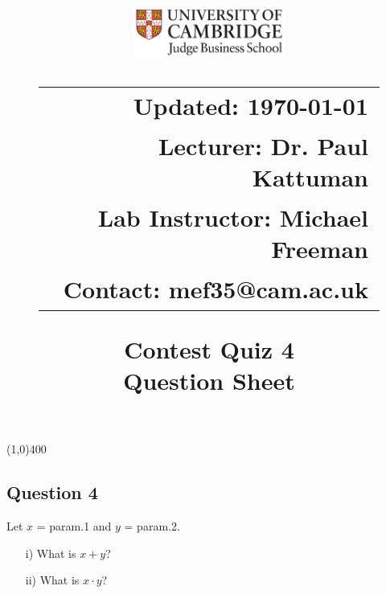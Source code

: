 \documentclass[11pt,a4paper]{article}
\title{\begin{figure}[t!]\vspace{-30px}\hspace{-30px}\includegraphics[width=50mm]{jbslogo.jpg}
\hspace{160px}\parbox{8cm}{\vspace{-30px}\begin{tabular}{ r} {\bf Updated:}\hspace{16px} \today \vspace*{0.2cm}\\ {\bf Lecturer:}\hspace{3px} Dr. Paul Kattuman \\{\bf Lab Instructor:}\hspace{16px} Michael Freeman \\ {\bf Contact:}\hspace{13px} mef35@cam.ac.uk\end{tabular}}
\end{figure}
\vspace{-1cm}\Huge Contest Quiz 4\\\vspace*{0.2cm} \huge Question Sheet \author{}\date{}}
\begin{document}
\maketitle
\begin{center}\vspace{-1.4cm}
\line(1,0){400}
\end{center}

\subsection*{Question 4}
Let $x$ = param.1 and $y$ = param.2.
\begin{itemize}
 \item[i)] What is $x+y$?
 \item[ii)] What is $x\cdot y$?
\end{itemize}
\end{document}
